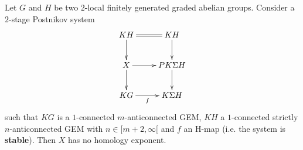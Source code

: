Let $G$ and $H$ be two $2$-local finitely generated graded abelian groups. Consider a $2$-stage Postnikov system
$$\xymatrix{
KH\ar@{=}[r]\ar[d] &KH\ar[d]\\
X\ar[r]\ar[d] &PK\Sigma H\ar[d]\\
KG\ar[r]_-f &K\Sigma H
}$$ such that $KG$ is a $1$-connected $m$-anticonnected GEM, $KH$ a $1$-connected strictly $n$-anticonnected GEM with $n\in[m+2,\infty[$ and $f$ an H-map (i.e. the system is {\bf stable}). Then $X$ has no homology exponent.
\endinput